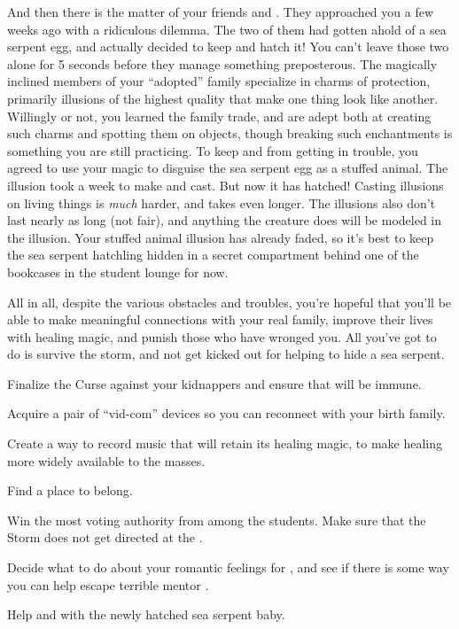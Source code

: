 \documentclass[char]{GL2020}
\begin{document}
And then there is the matter of your friends \cDisney{\full} and \cPirateChild{\full}. They approached you a few weeks ago with a ridiculous dilemma. The two of them had gotten ahold of a sea serpent egg, and actually decided to keep and hatch it! You can't leave those two alone for 5 seconds before they manage something preposterous. The magically inclined members of your ``adopted'' family specialize in charms of protection, primarily illusions of the highest quality that make one thing look like another. Willingly or not, you learned the family trade, and are adept both at creating such charms and spotting them on objects, though breaking such enchantments is something you are still practicing. To keep \cDisney{} and \cPirateChild{} from getting in trouble, you agreed to use your magic to disguise the sea serpent egg as a stuffed animal. The illusion took a week to make and cast. But now it has hatched! Casting illusions on living things is \emph{much} harder, and takes even longer. The illusions also don't last nearly as long (not fair), and anything the creature does will be modeled in the illusion. Your stuffed animal illusion has already faded, so it's best to keep the sea serpent hatchling hidden in a secret compartment behind one of the bookcases in the student lounge for now.

All in all, despite the various obstacles and troubles, you're hopeful that you'll be able to make meaningful connections with your real family, improve their lives with healing magic, and punish those who have wronged you.  All you've got to do is survive the storm, and not get kicked out for helping to hide a sea serpent.

\begin{itemz}
	\item Finalize the Curse against your kidnappers and ensure that \cMusic{} will be immune.
	\item Acquire a pair of ``vid-com'' devices so you can reconnect with your birth family.
	\item Create a way to record music that will retain its healing magic, to make healing more widely available to the masses.
	\item Find a place to belong.
	\item Win the most voting authority from among the \pFarmers{} students. Make sure that the Storm does not get directed at the \pFarm{}.
	\item Decide what to do about your romantic feelings for \cScholarship{}, and see if there is some way you can help \cScholarship{\them} escape \cScholarship{\their} terrible mentor \cAntiChup{}.
	\item Help \cPirateChild{} and \cDisney{} with the newly hatched sea serpent baby.
\end{itemz}
\end{document}
